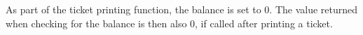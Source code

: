 As part of the ticket printing function, the balance is set to 0. The
value returned when checking for the balance is then also 0, if called
after printing a ticket.
